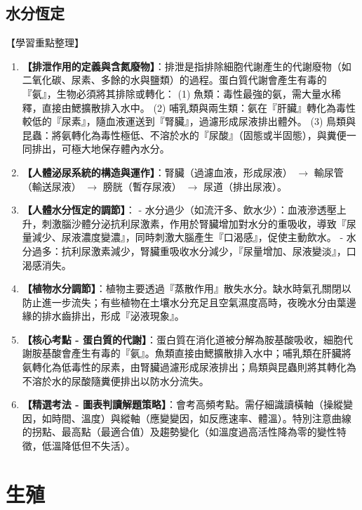 \documentclass[11pt,a4paper]{article}
\begin{document}
\subsection{水分恆定}
\begin{learningpoints}{【學習重點整理】}
\begin{enumerate}[label=\arabic*.]
  \item \textbf{【排泄作用的定義與含氮廢物】}：排泄是指排除細胞代謝產生的代謝廢物（如二氧化碳、尿素、多餘的水與鹽類）的過程。蛋白質代謝會產生有毒的『氨』，生物必須將其排除或轉化：
  (1) 魚類：毒性最強的氨，需大量水稀釋，直接由鰓擴散排入水中。
  (2) 哺乳類與兩生類：氨在『肝臟』轉化為毒性較低的『尿素』，隨血液運送到『腎臟』，過濾形成尿液排出體外。
  (3) 鳥類與昆蟲：將氨轉化為毒性極低、不溶於水的『尿酸』（固態或半固態），與糞便一同排出，可極大地保存體內水分。
  \item \textbf{【人體泌尿系統的構造與運作】}：腎臟（過濾血液，形成尿液） $\rightarrow$ 輸尿管（輸送尿液） $\rightarrow$ 膀胱（暫存尿液） $\rightarrow$ 尿道（排出尿液）。
  \item \textbf{【人體水分恆定的調節】}：
  - 水分過少（如流汗多、飲水少）：血液滲透壓上升，刺激腦沙體分泌抗利尿激素，作用於腎臟增加對水分的重吸收，導致『尿量減少、尿液濃度變濃』，同時刺激大腦產生『口渴感』，促使主動飲水。
  - 水分過多：抗利尿激素減少，腎臟重吸收水分減少，『尿量增加、尿液變淡』，口渴感消失。
  \item \textbf{【植物水分調節】}：植物主要透過『蒸散作用』散失水分。缺水時氣孔關閉以防止進一步流失；有些植物在土壤水分充足且空氣濕度高時，夜晚水分由葉邊緣的排水齒排出，形成『泌液現象』。
  \item \textbf{【核心考點 - 蛋白質的代謝】}：蛋白質在消化道被分解為胺基酸吸收，細胞代謝胺基酸會產生有毒的『氨』。魚類直接由鰓擴散排入水中；哺乳類在肝臟將氨轉化為低毒性的尿素，由腎臟過濾形成尿液排出；鳥類與昆蟲則將其轉化為不溶於水的尿酸隨糞便排出以防水分流失。
  \item \textbf{【精選考法 - 圖表判讀解題策略】}：會考高頻考點。需仔細識讀橫軸（操縱變因，如時間、溫度）與縱軸（應變變因，如反應速率、體溫）。特別注意曲線的拐點、最高點（最適合值）及趨勢變化（如溫度過高活性降為零的變性特徵，低溫降低但不失活）。
\end{enumerate}
\end{learningpoints}

\newpage
\section{生殖}
\end{document}
